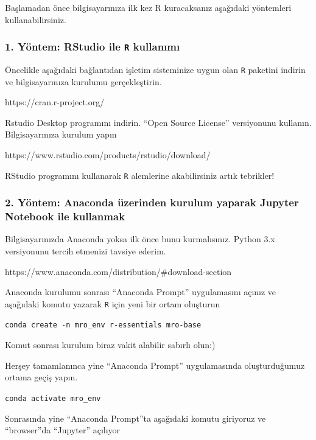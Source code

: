 \documentclass[11pt]{article}
\begin{document}
    Başlamadan önce bilgisayarınıza ilk kez R kuracaksanız aşağıdaki
yöntemleri kullanabilirsiniz.

    \hypertarget{yuxf6ntem-rstudio-ile-r-kullanux131mux131}{%
\subsubsection{\texorpdfstring{1. Yöntem: RStudio ile \texttt{R}
kullanımı}{1. Yöntem: RStudio ile R kullanımı}}\label{yuxf6ntem-rstudio-ile-r-kullanux131mux131}}

    Öncelikle aşağıdaki bağlantıdan işletim sisteminize uygun olan
\texttt{R} paketini indirin ve bilgisayarınıza kurulumu gerçekleştirin.

    https://cran.r-project.org/

    Rstudio Desktop programını indirin. ``Open Source License'' versiyonunu
kullanın. Bilgisayarınıza kurulum yapın

    https://www.rstudio.com/products/rstudio/download/

    RStudio programını kullanarak \texttt{R} alemlerine akabilirsiniz artık
tebrikler!

    \hypertarget{yuxf6ntem-anaconda-uxfczerinden-kurulum-yaparak-jupyter-notebook-ile-kullanmak}{%
\subsubsection{2. Yöntem: Anaconda üzerinden kurulum yaparak Jupyter
Notebook ile
kullanmak}\label{yuxf6ntem-anaconda-uxfczerinden-kurulum-yaparak-jupyter-notebook-ile-kullanmak}}

    Bilgisayarınızda Anaconda yoksa ilk önce bunu kurmalısınız. Python 3.x
versiyonunu tercih etmenizi tavsiye ederim.

    https://www.anaconda.com/distribution/\#download-section

    Anaconda kurulumu sonrası ``Anaconda Prompt'' uygulamasını açınız ve
aşağıdaki komutu yazarak \texttt{R} için yeni bir ortam oluşturun

    \texttt{conda\ create\ -n\ mro\_env\ r-essentials\ mro-base}

    Komut sonrası kurulum biraz vakit alabilir sabırlı olun:)

    Herşey tamamlanınca yine ``Anaconda Prompt'' uygulamasında
oluşturduğumuz ortama geçiş yapın.

    \texttt{conda\ activate\ mro\_env}

    Sonrasında yine ``Anaconda Prompt''ta aşağıdaki komutu giriyoruz ve
``browser''da ``Jupyter'' açılıyor
\end{document}
